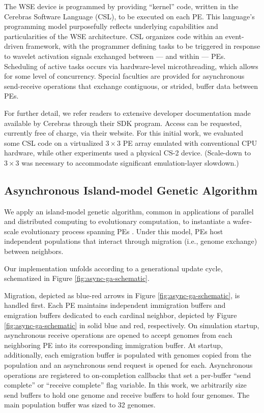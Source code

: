 The WSE device is programmed by providing ``kernel'' code, written in the Cerebras Software Language (CSL), to be executed on each PE.
This language's programming model purposefully reflects underlying capabilities and particularities of the WSE architecture.
CSL organizes code within an event-driven framework, with the programmer defining tasks to be triggered in response to wavelet activation signals exchanged between --- and within --- PEs.
Scheduling of active tasks occurs via hardware-level microthreading, which allows for some level of concurrency.
Special faculties are provided for asynchronous send-receive operations that exchange contiguous, or strided, buffer data between PEs.

For further detail, we refer readers to extensive developer documentation made available by Cerebras through their SDK program.
Access can be requested, currently free of charge, via their website.
For this initial work, we evaluated some CSL code on a virtualized $3\times3$ PE array emulated with conventional CPU hardware, while other experiments used a physical CS-2 device.
(Scale-down to $3\times3$ was necessary to accommodate significant emulation-layer slowdown.)

\subsection{Asynchronous Island-model Genetic Algorithm}



We apply an island-model genetic algorithm, common in applications of parallel and distributed computing to evolutionary computation, to instantiate a wafer-scale evolutionary process spanning PEs \citep{bennett1999building}.
Under this model, PEs host independent populations that interact through migration (i.e., genome exchange) between neighbors.

Our implementation unfolds according to a generational update cycle, schematized in Figure \ref{fig:async-ga-schematic}.

Migration, depicted as blue-red arrows in Figure \ref{fig:async-ga-schematic}, is handled first.
Each PE maintains independent immigration buffers and emigration buffers dedicated to each cardinal neighbor, depicted by Figure \ref{fig:async-ga-schematic} in solid blue and red, respectively.
On simulation startup, asynchronous receive operations are opened to accept genomes from each neighboring PE into its corresponding immigration buffer.
At startup, additionally, each emigration buffer is populated with genomes copied from the population and an asynchronous send request is opened for each. %
Asynchronous operations are registered to on-completion callbacks that set a per-buffer ``send complete'' or ``receive complete'' flag variable.
In this work, we arbitrarily size send buffers to hold one genome and receive buffers to hold four genomes.
The main population buffer was sized to 32 genomes.

